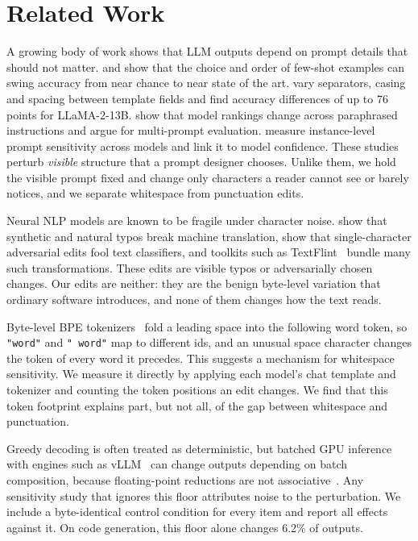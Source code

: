 \section{Related Work}
\label{sec:related}

A growing body of work shows that LLM outputs depend on prompt details that should not matter.
\citet{zhao2021calibrate} and \citet{lu2022fantastically} show that the choice and order of few-shot examples can swing accuracy from near chance to near state of the art.
\citet{sclar2024quantifying} vary separators, casing and spacing between template fields and find accuracy differences of up to 76 points for LLaMA-2-13B.
\citet{mizrahi2024state} show that model rankings change across paraphrased instructions and argue for multi-prompt evaluation.
\citet{zhuo2024prosa} measure instance-level prompt sensitivity across models and link it to model confidence.
These studies perturb \emph{visible} structure that a prompt designer chooses.
Unlike them, we hold the visible prompt fixed and change only characters a reader cannot see or barely notices, and we separate whitespace from punctuation edits.

Neural NLP models are known to be fragile under character noise.
\citet{belinkov2018synthetic} show that synthetic and natural typos break machine translation, \citet{pruthi2019combating} show that single-character adversarial edits fool text classifiers, and toolkits such as TextFlint~\cite{wang2021textflint} bundle many such transformations.
These edits are visible typos or adversarially chosen changes.
Our edits are neither: they are the benign byte-level variation that ordinary software introduces, and none of them changes how the text reads.

Byte-level BPE tokenizers~\cite{sennrich2016neural,radford2019language} fold a leading space into the following word token, so \texttt{"word"} and \texttt{"~word"} map to different ids, and an unusual space character changes the token of every word it precedes.
This suggests a mechanism for whitespace sensitivity.
We measure it directly by applying each model's chat template and tokenizer and counting the token positions an edit changes.
We find that this token footprint explains part, but not all, of the gap between whitespace and punctuation.

Greedy decoding is often treated as deterministic, but batched GPU inference with engines such as vLLM~\cite{kwon2023efficient} can change outputs depending on batch composition, because floating-point reductions are not associative~\cite{atil2024llm}.
Any sensitivity study that ignores this floor attributes noise to the perturbation.
We include a byte-identical control condition for every item and report all effects against it.
On code generation, this floor alone changes 6.2\% of outputs.
